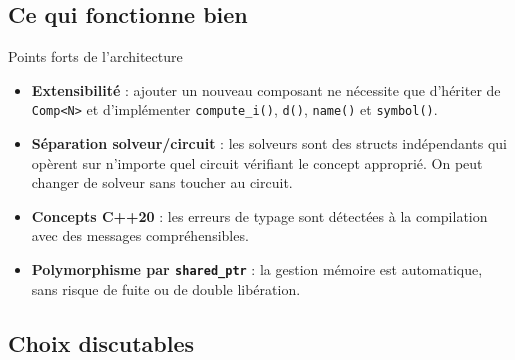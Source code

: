 \documentclass[12pt,a4paper]{article}
\begin{document}
\subsection{Ce qui fonctionne bien}

\begin{successbox}{Points forts de l'architecture}
\begin{itemize}
  \item \textbf{Extensibilité} : ajouter un nouveau composant ne nécessite que
        d'hériter de \texttt{Comp<N>} et d'implémenter \texttt{compute\_i()},
        \texttt{d()}, \texttt{name()} et \texttt{symbol()}.
  \item \textbf{Séparation solveur/circuit} : les solveurs sont des structs
        indépendants qui opèrent sur n'importe quel circuit vérifiant le concept
        approprié. On peut changer de solveur sans toucher au circuit.
  \item \textbf{Concepts C++20} : les erreurs de typage sont détectées à la
        compilation avec des messages compréhensibles.
  \item \textbf{Polymorphisme par \texttt{shared\_ptr}} : la gestion mémoire est
        automatique, sans risque de fuite ou de double libération.
\end{itemize}
\end{successbox}

\subsection{Choix discutables}
\end{document}
